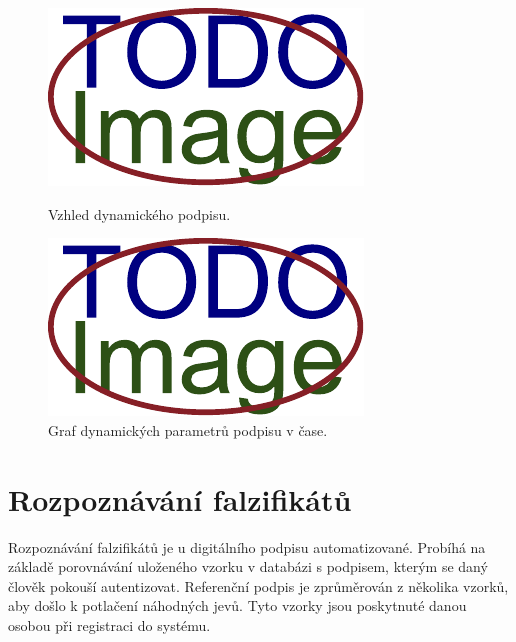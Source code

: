 \begin{figure}[h]
\centering
\begin{minipage}{0.45\textwidth}
    \centering
    \includegraphics[width=\textwidth]{obrazky-figures/placeholder.pdf}
    \caption{Vzhled dynamického podpisu.}
    \label{fig:first-image}
\end{minipage}\hfill
\begin{minipage}{0.45\textwidth}
    \centering
    \includegraphics[width=\textwidth]{obrazky-figures/placeholder.pdf}
    \caption{Graf dynamických parametrů podpisu v čase.}
    \label{fig:second-image}
\end{minipage}
\end{figure}


\section{Rozpoznávání falzifikátů}
Rozpoznávání falzifikátů je u digitálního podpisu automatizované.
Probíhá na základě porovnávání uloženého vzorku v databázi s podpisem, kterým se daný člověk pokouší autentizovat. %
Referenční podpis je zprůměrován z několika vzorků, aby došlo k potlačení náhodných jevů. %
Tyto vzorky jsou poskytnuté danou osobou při registraci do systému.

